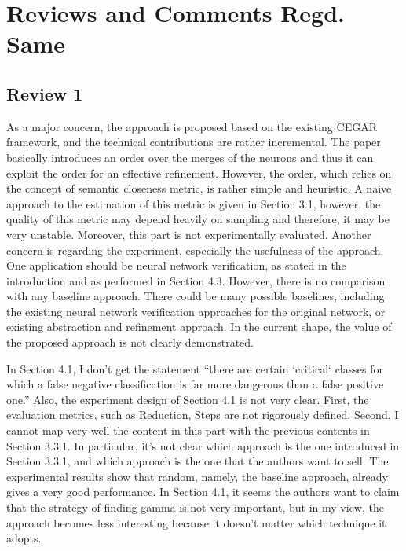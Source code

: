 \section{Reviews and Comments Regd. Same}

\subsection{Review 1}

 As a major concern, the approach is proposed based on the existing  CEGAR
 framework, and the technical contributions are rather  incremental. The paper
 basically introduces an order over the merges  of the neurons and thus it can
 exploit the order for an effective  refinement. However, the order, which
 relies on the concept of  semantic closeness metric, is rather simple and
 heuristic. A naive  approach to the estimation of this metric is given in
 Section 3.1,  however, the quality of this metric may depend heavily on
 sampling and  therefore, it may be very unstable. Moreover, this part is not
 experimentally evaluated.   Another concern is regarding the experiment,
 especially the usefulness  of the approach. One application should be neural
 network  verification, as stated in the introduction and as performed in
 Section 4.3. However, there is no comparison with any baseline  approach. There
 could be many possible baselines, including the  existing neural network
 verification approaches for the original  network, or existing abstraction and
 refinement approach. In the  current shape, the value of the proposed approach
 is not clearly  demonstrated.


  In Section 4.1, I don’t get the statement “there are certain  ‘critical‘
  classes for which a false negative classification is far  more dangerous than
  a false positive one.”
  Also, the experiment design of Section 4.1 is not very clear. First,  the
  evaluation metrics, such as Reduction, Steps are not rigorously  defined.
  Second, I cannot map very well the content in this part with  the previous
  contents in Section 3.3.1. In particular, it’s not clear  which approach is
  the one introduced in Section 3.3.1, and which  approach is the one that the
  authors want to sell. The experimental  results show that random, namely, the
  baseline approach, already gives  a very good performance.
  In Section 4.1, it seems the authors want to claim that the strategy  of
  finding gamma is not very important, but in my view, the approach  becomes
  less interesting because it doesn’t matter which technique it  adopts.

